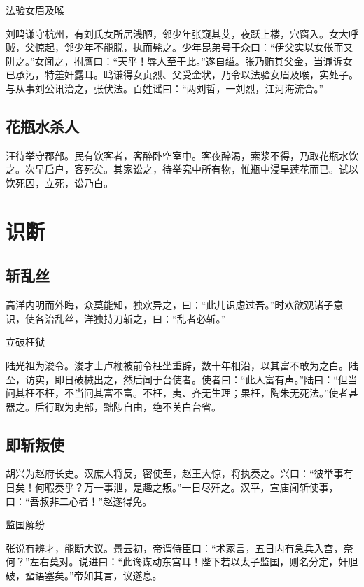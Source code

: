 \documentclass[a4paper,12pt,UTF8,twoside]{ctexbook}
\begin{document}
    法验女眉及喉
    
    刘鸣谦守杭州，有刘氏女所居浅陋，邻少年张窥其艾，夜跃上楼，穴窗入。女大呼贼，父惊起，邻少年不能脱，执而髡之。少年昆弟号于众曰：“伊父实以女伥而又阱之。”女闻之，拊膺曰：“天乎！辱人至于此。”遂自缢。张乃贿其父金，当谳诉女已承污，特羞奸露耳。鸣谦得女贞烈、父受金状，乃令以法验女眉及喉，实处子。与从事刘公讯治之，张伏法。百姓谣曰：“两刘哲，一刘烈，江河海流合。”
    
    \section{花瓶水杀人}
    
    汪待举守郡部。民有饮客者，客醉卧空室中。客夜醉渴，索浆不得，乃取花瓶水饮之。次早启户，客死矣。其家讼之，待举究中所有物，惟瓶中浸旱莲花而已。试以饮死囚，立死，讼乃白。
    
    \chapter{识断}
    
    \section{斩乱丝}
    
    高洋内明而外晦，众莫能知，独欢异之，曰：“此儿识虑过吾。”时欢欲观诸子意识，使各治乱丝，洋独持刀斩之，曰：“乱者必斩。”
    
    立破枉狱
    
    陆光祖为浚令。浚才士卢楩被前令枉坐重辟，数十年相沿，以其富不敢为之白。陆至，访实，即日破械出之，然后闻于台使者。使者曰：“此人富有声。”陆曰：“但当问其枉不枉，不当问其富不富。不枉，夷、齐无生理；果枉，陶朱无死法。”使者甚器之。后行取为吏部，黜陟自由，绝不关白台省。
    
    \section{即斩叛使}
    
    胡兴为赵府长史。汉庶人将反，密使至，赵王大惊，将执奏之。兴曰：“彼举事有日矣！何暇奏乎？万一事泄，是趣之叛。”一日尽歼之。汉平，宣庙闻斩使事，曰：“吾叔非二心者！”赵遂得免。
    
    监国解纷
    
    张说有辨才，能断大议。景云初，帝谓侍臣曰：“术家言，五日内有急兵入宫，奈何？”左右莫对。说进曰：“此谗谋动东宫耳！陛下若以太子监国，则名分定，奸胆破，蜚语塞矣。”帝如其言，议遂息。
    
\end{document}
